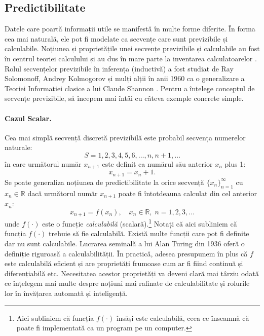 \documentclass[../../book-main_ro.tex]{subfiles}
\begin{document}
\subsection{Predictibilitate}
\label{sec:predictability}
Datele care poartă informații utile se manifestă în multe forme diferite. În forma cea mai naturală, ele pot fi modelate ca secvențe care sunt previzibile și calculabile. Noțiunea și proprietățile unei secvențe previzibile și calculabile au fost în centrul teoriei calculului și au dus în mare parte la inventarea calculatoarelor \cite{Turing-1936}. Rolul secvențelor previzibile în inferența (inductivă) a fost studiat de Ray Solomonoff, Andrey Kolmogorov și mulți alții în anii 1960 \cite{Kolmogorov1998OnTO} ca o generalizare a Teoriei Informației clasice a lui Claude Shannon \cite{Shannon-1948}. Pentru a înțelege conceptul de secvențe previzibile, să începem mai întâi cu câteva exemple concrete simple.
\paragraph{Cazul Scalar.} Cea mai simplă secvență discretă previzibilă este probabil secvența numerelor naturale:
\begin{equation}
   {S} =  1, 2, 3, 4, 5, 6, \ldots, n, n+1, \ldots
\end{equation}
în care următorul număr $x_{n+1}$ este definit ca numărul său anterior $x_n$ plus 1:
\begin{equation}
x_{n+1} = x_n + 1.
\end{equation}
Se poate generaliza noțiunea de predictibilitate la orice secvență $\{x_n\}_{n=1}^\infty$ cu $ x_n \in \mathbb{R}$ dacă următorul număr $x_{n+1}$ poate fi întotdeauna calculat din cel anterior $x_n$:
\begin{equation}
    x_{n+1} = f(x_{n}), \quad x_n \in \mathbb{R}, \; n =  1, 2, 3, \ldots
\end{equation}
unde $f(\cdot)$ este o funcție {\em calculabilă} (scalară).\footnote{Aici subliniem că funcția $f(\cdot)$ însăși este calculabilă, ceea ce înseamnă că poate fi implementată ca un program pe un computer.} Notați că aici subliniem că funcția $f(\cdot)$ trebuie să fie calculabilă. Există multe funcții care pot fi definite dar nu sunt calculabile. Lucrarea seminală a lui Alan Turing din 1936 \cite{Turing-1936} oferă o definiție riguroasă a calculabilității. În practică, adesea presupunem în plus că $f$ este calculabilă eficient și are proprietăți frumoase cum ar fi fiind continuă și diferențiabilă etc. Necesitatea acestor proprietăți va deveni clară mai târziu odată ce înțelegem mai multe despre noțiuni mai rafinate de calculabilitate și rolurile lor în învățarea automată și inteligență.
\end{document}
